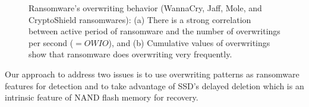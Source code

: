 \documentclass[conference]{IEEEtran}
\begin{document}
\begin{figure}
	\centering
	\caption{Ransomware's overwriting behavior (WannaCry, Jaff, Mole, and CryptoShield ransomwares):
	(a) There is a strong correlation between active period of ransomware and the number of overwritings per second ($=OWIO$), and 
	(b) Cumulative values of overwritings show that ransomware does overwriting very frequently.\label{fig-owio}}
\end{figure}

Our approach to address two issues is to use overwriting patterns 
as ransomware features for detection
and to take advantage of SSD's delayed deletion which is
an intrinsic feature of NAND flash memory for recovery.
\end{document}
